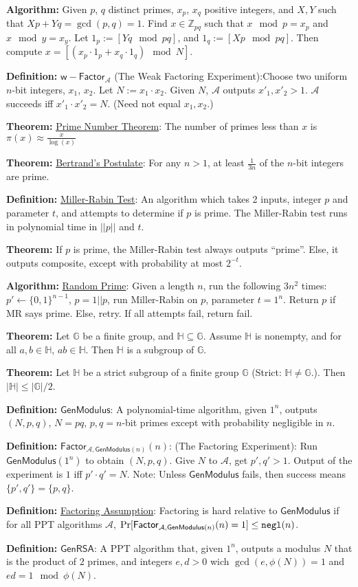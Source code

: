 \documentclass[10pt]{article}
\newcommand{\Z}{\mathbb{Z}}
\newcommand{\G}{\mathbb{G}}
\newcommand{\HH}{\mathbb{H}}
\newcommand{\AAA}{\mathcal{A}}
\newcommand{\defn}[1]{{\bf Definition:} \underline{#1}}
\newcommand{\thm}[1]{{\bf Theorem:} \underline{#1}}
\newcommand{\alg}[1]{{\bf Algorithm:} \underline{#1}}
\newcommand{\GenM}{\mathsf{GenModulus}}
\newcommand{\GenRSA}{\mathsf{GenRSA}}
\newcommand{\ExptFacArgs}[2]{\mathsf{Factor}_{#1,#2}}
\newcommand{\ExptWFacArgs}[1]{\mathsf{w-Factor}_{#1}}
\newcommand{\ExptFac}{\ExptFacArgs{\AAA}{\GenM(n)}}
\newcommand{\ExptWFac}{\ExptWFacArgs{\AAA}}
\newcommand{\negl}{{\tt negl}}
\newcommand{\from}{\leftarrow}
\begin{document}
\begin{multicols}{3}
\alg{}Given $p$, $q$ distinct primes, $x_p$, $x_q$ positive integers, and $X,Y$ such that $Xp+Yq=\gcd(p,q)=1$. Find $x\in\Z_{pq}$ such that $x\mod{p}=x_p$ and $x\mod{y}=x_y$. Let $1_p:=[Yq\mod{pq}]$, and $1_q:=[Xp\mod{pq}]$. Then compute $x=[(x_p\cdot 1_p+x_q\cdot 1_q)\mod{N}]$.

\defn{$\ExptWFac$} (The Weak Factoring Experiment):Choose two uniform $n$-bit integers, $x_1$, $x_2$. Let $N:=x_1\cdot x_2$. Given $N$, $\AAA$ outputs $x'_1,x'_2>1$. $\AAA$ succeeds iff $x'_1\cdot x'_2=N$. (Need not equal $x_1,x_2$.)

\thm{Prime Number Theorem}: The number of primes less than $x$ is $\pi(x)\approx\frac{x}{\log(x)}$

\thm{Bertrand's Postulate}: For any $n>1$, at least $\frac{1}{3n}$ of the $n$-bit integers are prime.

\defn{Miller-Rabin Test}: An algorithm which takes 2 inputs, integer $p$ and parameter $t$, and attempts to determine if $p$ is prime. The Miller-Rabin test runs in polynomial time in $||p||$ and $t$.

\thm{}If $p$ is prime, the Miller-Rabin test always outputs ``prime''. Else, it outputs composite, except with probability at most $2^{-t}$.

\alg{Random Prime}: Given a length $n$, run the following $3n^2$ times: $p'\from\{0,1\}^{n-1}$, $p=1||p$, run Miller-Rabin on $p$, parameter $t=1^n$. Return $p$ if MR says prime. Else, retry. If all attempts fail, return fail.

\thm{}Let $\G$ be a finite group, and $\HH\subseteq\G$. Assume $\HH$ is nonempty, and for all $a,b\in\HH$, $ab\in\HH$. Then $\HH$ is a subgroup of $\G$.

\thm{}Let $\HH$ be a strict subgroup of a finite group $\G$ (Strict: $\HH\neq \G$.). Then $|\HH|\leq|\G|/2$.

\defn{$\GenM$}: A polynomial-time algorithm, given $1^n$, outputs $(N,p,q)$, $N=pq$, $p,q=n$-bit primes except with probability negligible in $n$.

\defn{$\ExptFac(n)$}: (The Factoring Experiment): Run $\GenM(1^n)$ to obtain $(N,p,q)$. Give $N$ to $\AAA$, get $p',q'>1$. Output of the experiment is $1$ iff $p'\cdot q'=N$. Note: Unless $\GenM$ fails, then success means $\{p',q'\}=\{p,q\}$.

\defn{Factoring Assumption}: Factoring is hard relative to $\GenM$ if for all PPT algorithms $\AAA$, $\Pr[\ExptFac(n)=1]\leq\negl(n)$.

\defn{$\GenRSA$}: A PPT algorithm that, given $1^n$, outputs a modulus $N$ that is the product of $2$ primes, and integers $e,d>0$ wich $\gcd(e,\phi(N))=1$ and $ed=1\mod{\phi(N)}$.


\end{multicols}
\end{document}
